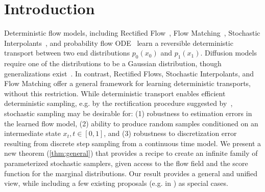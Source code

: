 \section{Introduction}

Deterministic flow models, including Rectified Flow~\citep{liu2022flow}, Flow Matching~\citep{lipman2022flow,tong2023improving}, Stochastic Interpolants~\citep{albergo2022building, albergo2023stochastic}, and probability flow ODE~\citep{song2020score} learn a reversible deterministic transport between two end distributions $p_0(x_0)$ and $p_1(x_1)$.
Diffusion models require one of the distributions to be a Gaussian distribution, though generalizations exist~\citep{yoon2024score}.
In contrast, Rectified Flows, Stochastic Interpolants, and Flow Matching offer a general framework for learning deterministic transports, without this restriction.
While deterministic transport enables efficient deterministic sampling, e.g. by the rectification procedure suggested by~\citet{liu2022flow}, stochastic sampling may be desirable for:
(1) robustness to estimation errors in the learned flow model,
(2) ability to produce random samples conditioned on an intermediate state $x_t, t \in [0, 1]$,
and (3) robustness to discretization error resulting from discrete step sampling from a continuous time model.
We present a new theorem (\cref{thm:general}) that provides a recipe to create an infinite family of parameterized stochastic samplers, given access to the flow field and the score function for the marginal distributions.
Our result provides a general and unified view, while including a few existing proposals (e.g. in \cite{huang2021variational,berner2022optimal}) as special cases.

